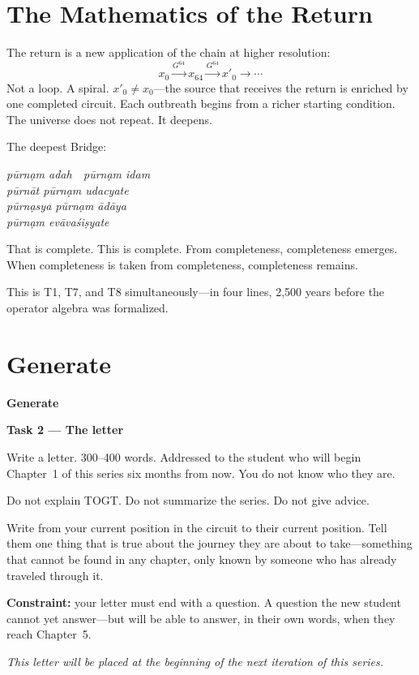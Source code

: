 \documentclass[11pt, twoside, openright]{book}
\theoremstyle{plain}
\theoremstyle{definition}
\newenvironment{generatebox}{%
  \begin{mdframed}[backgroundcolor=GenerateBox,linecolor=red!50!black,linewidth=0.5pt,innertopmargin=6pt,innerbottommargin=6pt]
  \noindent\textbf{Generate}\par\medskip}{\end{mdframed}}
\begin{document}
\section{The Mathematics of the Return}

The return is a new application of the chain at higher resolution:
\[
x_0 \xrightarrow{G^{64}} x_{64} \xrightarrow{G^{64}} x'_0 \to \cdots
\]
Not a loop. A spiral. $x'_0 \neq x_0$---the source that receives the return
is enriched by one completed circuit. Each outbreath begins from a richer
starting condition. The universe does not repeat. It deepens.

The deepest Bridge:
\begin{center}
\textit{p\=urn\d{a}m adah\ \ p\=urn\d{a}m idam}\\
\textit{p\=urn\={a}t p\=urn\d{a}m udacyate}\\
\textit{p\=urn\d{a}sya p\=urn\d{a}m \={a}d\={a}ya}\\
\textit{p\=urn\d{a}m ev\={a}va\'{s}i\d{s}yate}
\end{center}

That is complete. This is complete. From completeness, completeness
emerges. When completeness is taken from completeness, completeness
remains.

This is T1, T7, and T8 simultaneously---in four lines, 2,500 years
before the operator algebra was formalized.

\section{Generate}

\begin{generatebox}
\textbf{Task 2 --- The letter}

Write a letter. 300--400 words. Addressed to the student who will
begin Chapter~1 of this series six months from now. You do not know
who they are.

Do not explain TOGT. Do not summarize the series. Do not give advice.

Write from your current position in the circuit to their current
position. Tell them one thing that is true about the journey they
are about to take---something that cannot be found in any chapter,
only known by someone who has already traveled through it.

\textbf{Constraint:} your letter must end with a question. A question the
new student cannot yet answer---but will be able to answer, in their
own words, when they reach Chapter~5.

\medskip
\textit{This letter will be placed at the beginning of the next iteration
of this series.}
\end{generatebox}
\end{document}

